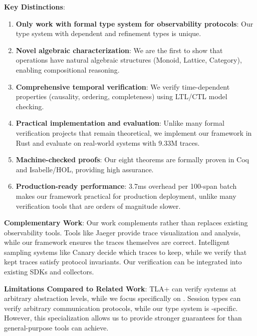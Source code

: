 \textbf{Key Distinctions}:
\begin{enumerate}
\item \textbf{Only work with formal type system for observability protocols}: Our \otlp type system with dependent and refinement types is unique.

\item \textbf{Novel algebraic characterization}: We are the first to show that \otlp operations have natural algebraic structures (Monoid, Lattice, Category), enabling compositional reasoning.

\item \textbf{Comprehensive temporal verification}: We verify time-dependent properties (causality, ordering, completeness) using LTL/CTL model checking.

\item \textbf{Practical implementation and evaluation}: Unlike many formal verification projects that remain theoretical, we implement our framework in Rust and evaluate on real-world systems with 9.33M traces.

\item \textbf{Machine-checked proofs}: Our eight theorems are formally proven in Coq and Isabelle/HOL, providing high assurance.

\item \textbf{Production-ready performance}: 3.7ms overhead per 100-span batch makes our framework practical for production deployment, unlike many verification tools that are orders of magnitude slower.
\end{enumerate}

\textbf{Complementary Work}: Our work complements rather than replaces existing observability tools. Tools like Jaeger provide trace visualization and analysis, while our framework ensures the traces themselves are correct. Intelligent sampling systems like Canary decide which traces to keep, while we verify that kept traces satisfy protocol invariants. Our verification can be integrated into existing \otlp SDKs and collectors.

\textbf{Limitations Compared to Related Work}: TLA+ can verify systems at arbitrary abstraction levels, while we focus specifically on \otlp. Session types can verify arbitrary communication protocols, while our type system is \otlp-specific. However, this specialization allows us to provide stronger guarantees for \otlp than general-purpose tools can achieve.
